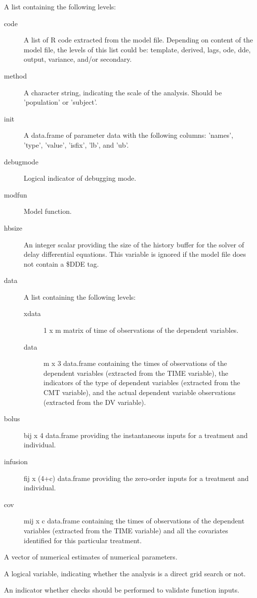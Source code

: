 \begin{Arguments}
\begin{ldescription}
\item[\code{subproblem}] A list containing the following levels:\begin{description}

\item[code] A list of R code extracted from the model file. Depending on 
content of the model file, the levels of this list could be: template,
derived, lags, ode, dde, output, variance, and/or secondary.
\item[method] A character string, indicating the scale of the analysis. Should
be 'population' or 'subject'.
\item[init] A data.frame of parameter data with the following columns:
'names', 'type', 'value', 'isfix', 'lb', and 'ub'.
\item[debugmode] Logical indicator of debugging mode.
\item[modfun] Model function.
\item[hbsize] An integer scalar providing the size of the history buffer for
the solver of delay differential equations. This variable is ignored if
the model file does not contain a \$DDE tag.
\item[data] A list containing the following levels:\begin{description}

\item[xdata] 1 x m matrix of time of observations of the dependent
variables.
\item[data] m x 3 data.frame containing the times of observations of the
dependent variables (extracted from the TIME variable), the indicators 
of the type of dependent variables (extracted from the CMT variable), 
and the actual dependent variable observations (extracted from the DV 
variable).

\end{description}


\item[bolus] bij x 4 data.frame providing the instantaneous inputs for a
treatment and individual.
\item[infusion] fij x (4+c) data.frame providing the zero-order inputs for a
treatment and individual.
\item[cov] mij x c data.frame containing the times of observations of the 
dependent variables (extracted from the TIME variable) and all the
covariates identified for this particular treatment.

\end{description}


\item[\code{x}] A vector of numerical estimates of numerical parameters.
\item[\code{grid}] A logical variable, indicating whether the analysis is a direct
grid search or not.
\item[\code{check}] An indicator whether checks should be performed to validate 
function inputs.
\end{ldescription}
\end{Arguments}
